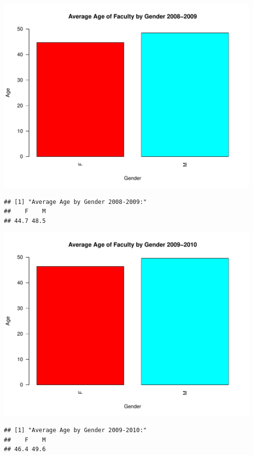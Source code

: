 \documentclass[12pt,a4paper]{article}\usepackage[]{graphicx}\usepackage[]{color}
\makeatletter
\def\maxwidth{ %
  \ifdim\Gin@nat@width>\linewidth
    \linewidth
  \else
    \Gin@nat@width
  \fi
}
\newenvironment{kframe}{%
 \def\at@end@of@kframe{}%
 \ifinner\ifhmode%
  \def\at@end@of@kframe{\end{minipage}}%
  \begin{minipage}{\columnwidth}%
 \fi\fi%
 \def\FrameCommand##1{\hskip\@totalleftmargin \hskip-\fboxsep
 \colorbox{shadecolor}{##1}\hskip-\fboxsep
     \hskip-\linewidth \hskip-\@totalleftmargin \hskip\columnwidth}%
 \MakeFramed {\advance\hsize-\width
   \@totalleftmargin\z@ \linewidth\hsize
   \@setminipage}}%
 {\par\unskip\endMakeFramed%
 \at@end@of@kframe}
\newenvironment{knitrout}{}{} %
\theoremstyle{definition}
\makeatother
\begin{document}
\begin{knitrout}
\includegraphics[width=\maxwidth]{figure/unnamed-chunk-11-5} 
\begin{kframe}\begin{verbatim}
## [1] "Average Age by Gender 2008-2009:"
##    F    M 
## 44.7 48.5
\end{verbatim}
\end{kframe}
\includegraphics[width=\maxwidth]{figure/unnamed-chunk-11-6} 
\begin{kframe}\begin{verbatim}
## [1] "Average Age by Gender 2009-2010:"
##    F    M 
## 46.4 49.6
\end{verbatim}
\end{kframe}

\end{knitrout}
\end{document}

